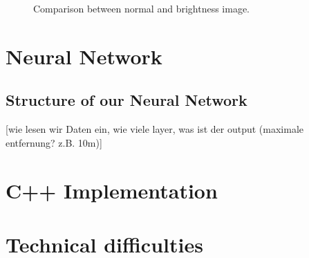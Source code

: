 \begin{figure}[h!]
	\centering
	\caption{Comparison between normal and brightness image.}
	\label{pic:implementation_opencv_brightness}
\end{figure}

\section{Neural Network}
\subsection{Structure of our Neural Network}

[wie lesen wir Daten ein, wie viele layer, was ist der output (maximale entfernung? z.B. 10m)]

\section{C++ Implementation}

\section{Technical difficulties}

\filbreak